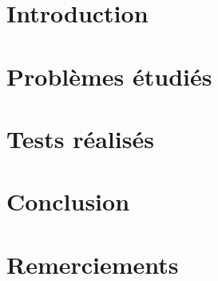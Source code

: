 \documentclass{report}
\newcommand{\blankpage}{\newpage \thispagestyle{empty} \addtocounter{page}{-1} \null \newpage}
\begin{document}
  
  \tableofcontents
  \setlength{\parskip}{10pt}
  \setlength{\parindent}{0pt}

  \chapter{Introduction}
    
  
  \chapter{Problèmes étudiés}
    
  
  \chapter{Tests réalisés}
    
  
  \chapter{Conclusion}
    
  
  \chapter*{Remerciements}

  \listoflistings
  \listoffigures
  \listoftables
\end{document}
